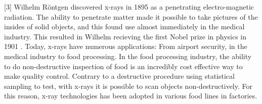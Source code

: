 \label{chap:intro}
[3]
Wilhelm Röntgen discovered x-rays in 1895 as a penetrating electro-magnetic radiation.
The ability to penetrate matter made it possible to take pictures of the insides of solid objects, and this found use almost immediately in the medical industry.
This resulted in Wilhelm recieving the first Nobel prize in physics in 1901 \cite{NobelPrizePhysics}.
Today, x-rays have numerous applications: From airport security, in the medical industry to food processing.
In the food processing industry, the ability to do non-destructive inspection of food is an incredibly cost effective way to make quality control.
Contrary to a destructive procedure using statistical sampling to test, with x-rays it is possible to scan objects non-destructively. 
For this reason, x-ray technologies has been adopted in various food lines in factories.\cite{haffXrayDetectionDefects2008}%

